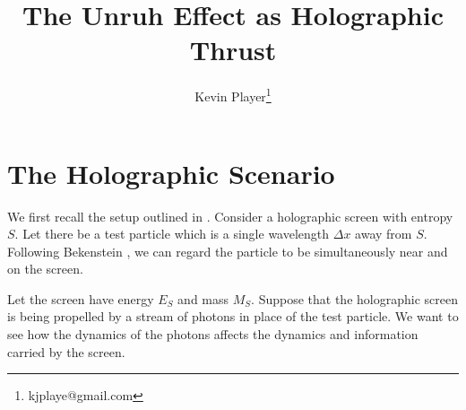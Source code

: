 \documentclass[12pt,a4paper]{article}
\begin{document}
\title{The Unruh Effect as Holographic Thrust}
\author[1]{Kevin Player\footnote{kjplaye@gmail.com}}

\maketitle


\section{The Holographic Scenario}
We first recall the setup outlined in \cite{entropic}. Consider a holographic screen with entropy $S$.  Let there be a test particle which is a single wavelength $\Delta x$ away from $S$.  Following Bekenstein \cite{bekenstein}, we can regard the particle to be simultaneously near and on the screen.

Let the screen have energy $E_S$ and mass $M_S$.  Suppose that the holographic screen is being propelled by a stream of photons in place of the test particle.  We want to see how the dynamics of the photons affects the dynamics and information carried by the screen.
\end{document}
